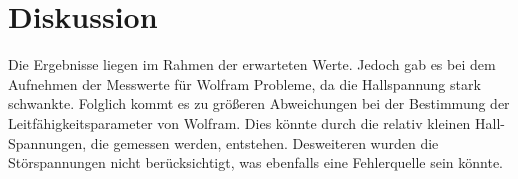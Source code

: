 \section{Diskussion}
\label{sec:Diskussion}
Die Ergebnisse liegen im Rahmen der erwarteten Werte. Jedoch
gab es bei dem Aufnehmen der Messwerte für Wolfram Probleme,
da die Hallspannung stark schwankte. Folglich kommt es zu größeren Abweichungen bei der Bestimmung der Leitfähigkeitsparameter von Wolfram.
Dies könnte durch die relativ kleinen Hall-Spannungen, die gemessen werden, entstehen.
Desweiteren wurden die Störspannungen nicht berücksichtigt, was ebenfalls eine Fehlerquelle sein könnte.
